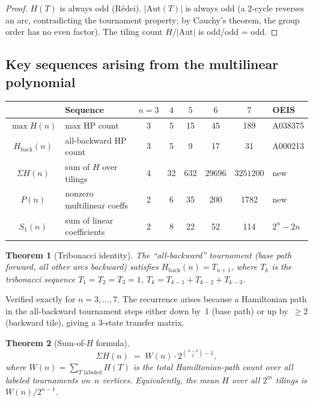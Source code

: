 \documentclass[12pt,reqno]{amsart}
\theoremstyle{plain}
\newtheorem{theorem}{Theorem}[section]
\theoremstyle{definition}
\theoremstyle{remark}
\begin{document}
\begin{proof}
$H(T)$ is always odd (R\'{e}dei). $|\mathrm{Aut}(T)|$ is always odd (a 2-cycle reverses an arc, contradicting the tournament property; by Cauchy's theorem, the group order has no even factor). The tiling count $H/|\mathrm{Aut}|$ is odd/odd = odd.
\end{proof}

\subsection{Key sequences arising from the multilinear polynomial}

\begin{center}
\renewcommand{\arraystretch}{1.12}
\begin{tabular}{clcccccl}
\hline
 & Sequence & $n{=}3$ & $4$ & $5$ & $6$ & $7$ & OEIS \\
\hline
$\max H(n)$ & max HP count & 3 & 5 & 15 & 45 & 189 & A038375 \\
$H_{\mathrm{back}}(n)$ & all-backward HP count & 3 & 5 & 9 & 17 & 31 & A000213 \\
$\Sigma H(n)$ & sum of $H$ over tilings & 4 & 32 & 632 & $29696$ & $3251200$ & new \\
$P(n)$ & nonzero multilinear coeffs & 2 & 6 & 35 & 200 & 1782 & new \\
$S_1(n)$ & sum of linear coefficients & 2 & 8 & 22 & 52 & 114 & $2^n{-}2n$ \\
\hline
\end{tabular}
\label{tab:sequences}
\end{center}

\begin{theorem}[Tribonacci identity]\label{thm:tribonacci}
The ``all-backward'' tournament (base path forward, all other arcs backward) satisfies
$H_{\mathrm{back}}(n) = T_{n+1}$, where $T_k$ is the tribonacci sequence $T_1 = T_2 = T_3 = 1$, $T_k = T_{k-1} + T_{k-2} + T_{k-3}$.
\end{theorem}

\noindent Verified exactly for $n = 3, \ldots, 7$.  The recurrence arises because a Hamiltonian path in the all-backward tournament steps either down by~1 (base path) or up by~$\geq 2$ (backward tile), giving a 3-state transfer matrix.

\begin{theorem}[Sum-of-$H$ formula]\label{thm:sigma_h}
\[
  \Sigma H(n) \;=\; W(n)\cdot 2^{\binom{n-2}{2} - 1},
\]
where $W(n) = \sum_{T\text{ labeled}} H(T)$ is the total Hamiltonian-path count over all labeled tournaments on~$n$ vertices.
Equivalently, the mean $H$ over all $2^m$ tilings is $W(n)/2^{n-1}$.
\end{theorem}
\end{document}
